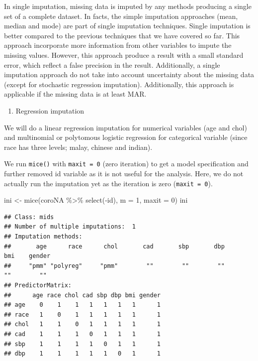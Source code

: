 \documentclass[
  10pt,
]{krantz}
\newenvironment{Shaded}{\begin{snugshade}}{\end{snugshade}}
\newcommand{\AttributeTok}[1]{\textcolor[rgb]{0.77,0.63,0.00}{#1}}
\newcommand{\DecValTok}[1]{\textcolor[rgb]{0.00,0.00,0.81}{#1}}
\newcommand{\FunctionTok}[1]{\textcolor[rgb]{0.00,0.00,0.00}{#1}}
\newcommand{\NormalTok}[1]{#1}
\newcommand{\OtherTok}[1]{\textcolor[rgb]{0.56,0.35,0.01}{#1}}
\newcommand{\SpecialCharTok}[1]{\textcolor[rgb]{0.00,0.00,0.00}{#1}}
\providecommand{\tightlist}{%
  \setlength{\itemsep}{0pt}\setlength{\parskip}{0pt}}
\begin{document}
In single imputation, missing data is imputed by any methods producing a single set of a complete dataset. In facts, the simple imputation approaches (mean, median and mode) are part of single imputation techniques. Single imputation is better compared to the previous techniques that we have covered so far. This approach incorporate more information from other variables to impute the missing values. However, this approach produce a result with a small standard error, which reflect a false precision in the result. Additionally, a single imputation approach do not take into account uncertainty about the missing data (except for stochastic regression imputation). Additionally, this approach is applicable if the missing data is at least MAR.

\begin{enumerate}
\def\labelenumi{\arabic{enumi}.}
\tightlist
\item
  Regression imputation
\end{enumerate}

We will do a linear regression imputation for numerical variables (age and chol) and multinomial or polytomous logistic regression for categorical variable (since race has three levels; malay, chinese and indian).

We run \texttt{mice()} with \texttt{maxit\ =\ 0} (zero iteration) to get a model specification and further removed id variable as it is not useful for the analysis. Here, we do not actually run the imputation yet as the iteration is zero (\texttt{maxit\ =\ 0}).

\begin{Shaded}
\begin{Highlighting}[]
\NormalTok{ini }\OtherTok{\textless{}{-}} \FunctionTok{mice}\NormalTok{(coroNA }\SpecialCharTok{\%\textgreater{}\%} \FunctionTok{select}\NormalTok{(}\SpecialCharTok{{-}}\NormalTok{id), }\AttributeTok{m =} \DecValTok{1}\NormalTok{, }\AttributeTok{maxit =} \DecValTok{0}\NormalTok{) }
\NormalTok{ini}
\end{Highlighting}
\end{Shaded}

\begin{verbatim}
## Class: mids
## Number of multiple imputations:  1 
## Imputation methods:
##       age      race      chol       cad       sbp       dbp       bmi    gender 
##     "pmm" "polyreg"     "pmm"        ""        ""        ""        ""        "" 
## PredictorMatrix:
##      age race chol cad sbp dbp bmi gender
## age    0    1    1   1   1   1   1      1
## race   1    0    1   1   1   1   1      1
## chol   1    1    0   1   1   1   1      1
## cad    1    1    1   0   1   1   1      1
## sbp    1    1    1   1   0   1   1      1
## dbp    1    1    1   1   1   0   1      1
\end{verbatim}
\end{document}
